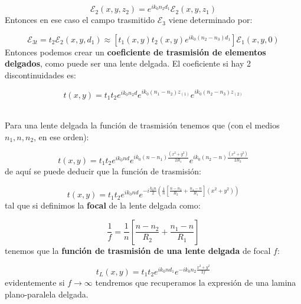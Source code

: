\documentclass[12pt,a4paper]{book}
\numberwithin{equation}{section}
\numberwithin{figure}{section}
\newcommand{\parentesis}[1]{\left( #1  \right)}
\newcommand{\ccorchetes}[1]{\left[ #1  \right]}
\newcommand{\1}{_{(1)}}
\newcommand{\2}{_{(2)}}
\theoremstyle{definition}
\begin{document}
\begin{equation}
\mathcal{E}_2 (x,y,z_2) = e^{i k_0 n_2 d_1} \mathcal{E}_2 (x,y,z_1)
\end{equation} 
Entonces en ese caso el campo trasmitido $\mathcal{E}_3$ viene determinado por:

\begin{equation}
\mathcal{E}_{3t} = t_2 \mathcal{E}_2 (x,y,d_1) \approx \ccorchetes{ t_1 (x,y) t_2(x,y) e^{i k_0 (n_2-n_3) d_{1}}} \mathcal{E}_1 (x,y,0)
\end{equation}
Entonces podemos crear un \textbf{coeficiente de trasmisión de elementos delgados}, como puede ser una lente delgada. El coeficiente si hay 2 discontinuidades es:

\begin{equation}
t(x,y) = t_1 t_2 e^{ik_0n_2d} e^{i k_0 (n_1-n_2)z_{(1)}} e^{i k_0 (n_2-n_3)z_{(2)}}
\end{equation} \\


\hrulefill

Para una lente delgada la función de trasmisión tenemos que (con el medios $n_1,n,n_2$, en ese orden):

\begin{equation}
t(x,y) = t_1 t_2 e^{ik_0 n d} e^{i k_0 (n-n_1) \frac{(x^2+y^2)}{2R_1}} e^{ik_0(n_2-n) \frac{(x^2+y^2)}{2R_2}}
\end{equation}
de aquí se puede deducir que la función de trasmisión:

\begin{equation}
t(x,y) = t_1 t_2 e^{i k_0 n d} e^{-i \frac{k_0 n}{2} \parentesis{\frac{1}{n} \ccorchetes{\frac{n-n_2}{R_2} +\frac{n_1-n}{R_1}} (x^2+y^2)}}
\end{equation}
tal que si definimos la \textbf{focal} de la lente delgada como:

\begin{equation}
\dfrac{1}{f} = \dfrac{1}{n} \ccorchetes{\dfrac{n-n_2}{R_2} + \dfrac{n_1-n}{R_1}}
\end{equation}
tenemos que la \textbf{función de trasmisión de una lente delgada} de focal $f$:

\begin{equation}
t_L (x,y) = t_1 t_2 e^{i k_0 nd_1} e^{-ik_0n_2 \frac{x^2+y^2}{2f}}
\end{equation}
evidentemente si $f\rightarrow\infty$ tendremos que recuperamos la expresión de una lamina plano-paralela delgada.  \\
\end{document}
